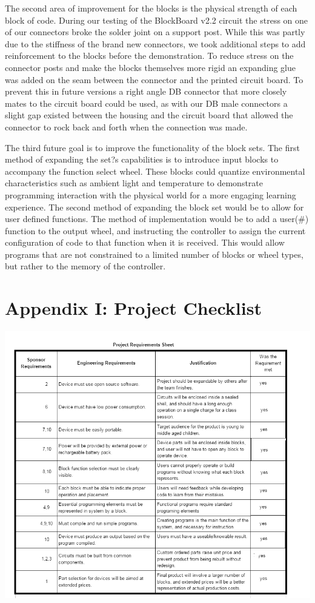 \documentclass[12pt,a4paper]{article}
\begin{document}
     The second area of improvement for the blocks is the physical strength of each block of code. During our testing of the BlockBoard v2.2 circuit the stress on one of our connectors broke the solder joint on a support post. While this was partly due to the stiffness of the brand new connectors, we took additional steps to add reinforcement to the blocks before the demonstration. To reduce stress on the connector posts and make the blocks themselves more rigid an expanding glue was added on the seam between the connector and the printed circuit board. To prevent this in future versions a right angle DB connector that more closely mates to the circuit board could be used, as with our DB male connectors a slight gap existed between the housing and the circuit board that allowed the connector to rock back and forth when the connection was made.
     
     The third future goal is to improve the functionality of the block sets. The first method of expanding the set?s capabilities is to introduce input blocks to accompany the function select wheel. These blocks could quantize environmental characteristics such as ambient light and temperature to demonstrate programming interaction with the physical world for a more engaging learning experience. The second method of expanding the block set would be to allow for user defined functions. The method of implementation would be to add a user(\#) function to the output wheel, and instructing the controller to assign the current configuration of code to that function when it is received. This would allow programs that are not constrained to a limited number of blocks or wheel types, but rather to the memory of the controller. 
     
  \section{Appendix I: Project Checklist} 
  \includegraphics[width=6.5in]{pds2.png}
\end{document}
